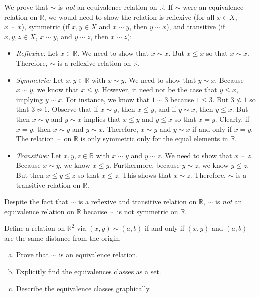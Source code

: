 \documentclass[11pt,letterpaper]{article}
\begin{document}
\sol We prove that $\sim$ is \textit{not} an equivalence relation on $\mathbb{R}$. If $\sim$ were an equivalence relation on $\mathbb{R}$, we would need to show the relation is reflexive (for all $x \in X$, $x \sim x$), symmetric (if $x, y \in X$ and $x \sim y$, then $y \sim x$), and transitive (if $x, y, z \in X$, $x \sim y$, and $y \sim z$, then $x \sim z$):
	\begin{itemize}
	\item \textit{Reflexive:} Let $x \in \mathbb{R}$. We need to show that $x \sim x$. But $x \leq x$ so that $x \sim x$. Therefore, $\sim$ is a reflexive relation on $\mathbb{R}$. 
	
	\item \textit{Symmetric:} Let $x, y \in \mathbb{R}$ with $x \sim y$. We need to show that $y \sim x$. Because $x \sim y$, we know that $x \leq y$. However, it need not be the case that $y \leq x$, implying $y \sim x$. For instance, we know that $1 \sim 3$ because $1 \leq 3$. But $3 \not\leq 1$ so that $3 \not\sim 1$. Observe that if $x \sim y$, then $x \leq y$, and if $y \sim x$, then $y \leq x$. But then $x \sim y$ and $y \sim x$ implies that $x \leq y$ and $y \leq x$ so that $x= y$. Clearly, if $x= y$, then $x \sim y$ and $y \sim x$. Therefore, $x \sim y$ and $y \sim x$ if and only if $x= y$. The relation $\sim$ on $\mathbb{R}$ is only symmetric only for the equal elements in $\mathbb{R}$. 
	
	\item \textit{Transitive:} Let $x, y, z \in \mathbb{R}$ with $x \sim y$ and $y \sim z$. We need to show that $x \sim z$. Because $x \sim y$, we know $x \leq y$. Furthermore, because $y \sim z$, we know $y \leq z$. But then $x \leq y \leq z$ so that $x \leq z$. This shows that $x \sim z$. Therefore, $\sim$ is a transitive relation on $\mathbb{R}$. 
	\end{itemize}

Despite the fact that $\sim$ is a reflexive and transitive relation on $\mathbb{R}$, $\sim$ is \textit{not} an equivalence relation on $\mathbb{R}$ because $\sim$ is not symmetric on $\mathbb{R}$. 



\newpage



 Define a relation on $\mathbb{R}^2$ via $(x, y) \sim (a, b)$ if and only if $(x, y)$ and $(a, b)$ are the same distance from the origin. 
	\begin{enumerate}[(a)]
	\item Prove that $\sim$ is an equivalence relation.
	\item Explicitly find the equivalences classes as a set. 
	\item Describe the equivalence classes graphically. 
	\end{enumerate} \pspace
\end{document}
